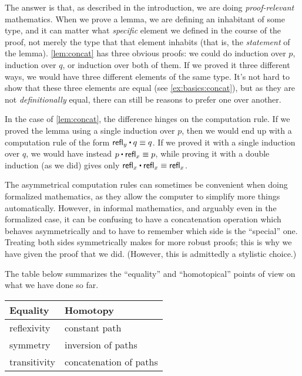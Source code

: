 The answer is that, as described in the introduction, we are doing \emph{proof-relevant} mathematics.
When we prove a lemma, we are defining an inhabitant of some type, and it can matter what \emph{specific} element we defined in the course of the proof, not merely the type that that element inhabits (that is, the \emph{statement} of the lemma).
\autoref{lem:concat} has three obvious proofs: we could do induction over $p$, induction over $q$, or induction over both of them.
If we proved it three different ways, we would have three different elements of the same type.
It's not hard to show that these three elements are equal (see \autoref{ex:basics:concat}), but as they are not \emph{definitionally} equal, there can still be reasons to prefer one over another.

In the case of \autoref{lem:concat}, the difference hinges on the computation rule.
If we proved the lemma using a single induction over $p$, then we would end up with a computation rule of the form $\refl{y} \ct q \jdeq q$.
If we proved it with a single induction over $q$, we would have instead $p\ct\refl{x}\jdeq p$, while proving it with a double induction (as we did) gives only $\refl{x}\ct\refl{x} \jdeq \refl{x}$.

The asymmetrical computation rules can sometimes be convenient when doing formalized mathematics, as they allow the computer to simplify more things automatically.
However, in informal mathematics, and arguably even in the formalized case, it can be confusing to have a concatenation operation which behaves asymmetrically and to have to remember which side is the ``special'' one.
Treating both sides symmetrically makes for more robust proofs; this is why we have given the proof that we did.
(However, this is admittedly a stylistic choice.)

The table below summarizes the ``equality'' and ``homotopical'' points of view on what we have done so far.
\begin{center}
  \medskip
  \begin{tabular}{ll}
    \toprule
    Equality & Homotopy \\
    \midrule
    reflexivity & constant path\\
    symmetry & inversion of paths\\
    transitivity & concatenation of paths \\
    \bottomrule
  \end{tabular}
  \medskip
\end{center}

